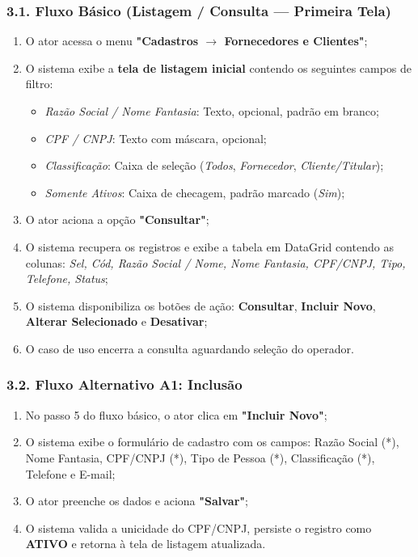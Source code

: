 \documentclass[
	12pt,
	oneside,
	a4paper,
	brazilian
]{abntex2}
\begin{document}
\subsubsection*{3.1. Fluxo Básico (Listagem / Consulta — Primeira Tela)}
\begin{enumerate}[leftmargin=0.8cm]
	\item O ator acessa o menu \textbf{"Cadastros $\rightarrow$ Fornecedores e Clientes"};
	\item O sistema exibe a \textbf{tela de listagem inicial} contendo os seguintes campos de filtro:
	\begin{itemize}
		\item \textit{Razão Social / Nome Fantasia}: Texto, opcional, padrão em branco;
		\item \textit{CPF / CNPJ}: Texto com máscara, opcional;
		\item \textit{Classificação}: Caixa de seleção (\textit{Todos}, \textit{Fornecedor}, \textit{Cliente/Titular});
		\item \textit{Somente Ativos}: Caixa de checagem, padrão marcado (\textit{Sim});
	\end{itemize}
	\item O ator aciona a opção \textbf{"Consultar"};
	\item O sistema recupera os registros e exibe a tabela em DataGrid contendo as colunas: \textit{Sel, Cód, Razão Social / Nome, Nome Fantasia, CPF/CNPJ, Tipo, Telefone, Status};
	\item O sistema disponibiliza os botões de ação: \textbf{Consultar}, \textbf{Incluir Novo}, \textbf{Alterar Selecionado} e \textbf{Desativar};
	\item O caso de uso encerra a consulta aguardando seleção do operador.
\end{enumerate}

\subsubsection*{3.2. Fluxo Alternativo A1: Inclusão}
\begin{enumerate}[leftmargin=0.8cm]
	\item No passo 5 do fluxo básico, o ator clica em \textbf{"Incluir Novo"};
	\item O sistema exibe o formulário de cadastro com os campos: Razão Social (*), Nome Fantasia, CPF/CNPJ (*), Tipo de Pessoa (*), Classificação (*), Telefone e E-mail;
	\item O ator preenche os dados e aciona \textbf{"Salvar"};
	\item O sistema valida a unicidade do CPF/CNPJ, persiste o registro como \textbf{ATIVO} e retorna à tela de listagem atualizada.
\end{enumerate}
\end{document}
